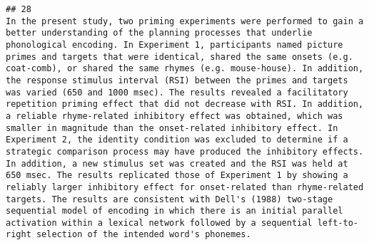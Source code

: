 \documentclass[
  english,
  man]{apa6}
\begin{document}
\begin{verbatim}
## 28                                                                                                                                                                                                                                                                                                                                                                                                                                                                                                                                                                                                                                                                                                                                                                                                                                                                                                                                                                                                                                                                                                                                                                                                                                                                                                                                                In the present study, two priming experiments were performed to gain a better understanding of the planning processes that underlie phonological encoding. In Experiment 1, participants named picture primes and targets that were identical, shared the same onsets (e.g. coat-comb), or shared the same rhymes (e.g. mouse-house). In addition, the response stimulus interval (RSI) between the primes and targets was varied (650 and 1000 msec). The results revealed a facilitatory repetition priming effect that did not decrease with RSI. In addition, a reliable rhyme-related inhibitory effect was obtained, which was smaller in magnitude than the onset-related inhibitory effect. In Experiment 2, the identity condition was excluded to determine if a strategic comparison process may have produced the inhibitory effects. In addition, a new stimulus set was created and the RSI was held at 650 msec. The results replicated those of Experiment 1 by showing a reliably larger inhibitory effect for onset-related than rhyme-related targets. The results are consistent with Dell's (1988) two-stage sequential model of encoding in which there is an initial parallel activation within a lexical network followed by a sequential left-to-right selection of the intended word's phonemes.

\end{verbatim}
\end{document}
